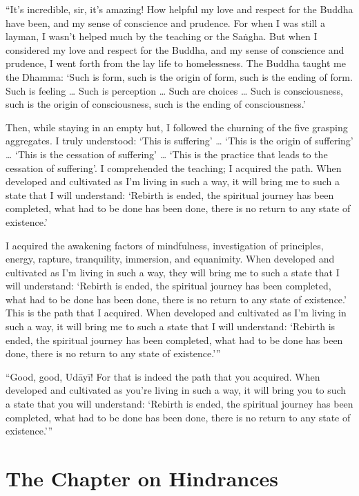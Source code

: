 \documentclass[12pt,openany]{book}%
\let\oldcontentsline\contentsline
\newcommand{\nopagecontentsline}[3]{\oldcontentsline{#1}{#2}{}}
\newcommand*{\tocchapterline}[1]{\bfseries\itshape{#1}}
\begin{document}
“It’s incredible, sir, it’s amazing! How helpful my love and respect for the Buddha have been, and my sense of conscience and prudence. For when I was still a layman, I wasn’t helped much by the teaching or the \textsanskrit{Saṅgha}. But when I considered my love and respect for the Buddha, and my sense of conscience and prudence, I went forth from the lay life to homelessness. The Buddha taught me the Dhamma: ‘Such is form, such is the origin of form, such is the ending of form. Such is feeling … Such is perception … Such are choices … Such is consciousness, such is the origin of consciousness, such is the ending of consciousness.’ 

Then, while staying in an empty hut, I followed the churning of the five grasping aggregates. I truly understood: ‘This is suffering’ … ‘This is the origin of suffering’ … ‘This is the cessation of suffering’ … ‘This is the practice that leads to the cessation of suffering’. I comprehended the teaching; I acquired the path. When developed and cultivated as I’m living in such a way, it will bring me to such a state that I will understand: ‘Rebirth is ended, the spiritual journey has been completed, what had to be done has been done, there is no return to any state of existence.’ 

I acquired the awakening factors of mindfulness, investigation of principles, energy, rapture, tranquility, immersion, and equanimity. When developed and cultivated as I’m living in such a way, they will bring me to such a state that I will understand: ‘Rebirth is ended, the spiritual journey has been completed, what had to be done has been done, there is no return to any state of existence.’ This is the path that I acquired. When developed and cultivated as I’m living in such a way, it will bring me to such a state that I will understand: ‘Rebirth is ended, the spiritual journey has been completed, what had to be done has been done, there is no return to any state of existence.’” 

“Good, good, \textsanskrit{Udāyī}! For that is indeed the path that you acquired. When developed and cultivated as you’re living in such a way, it will bring you to such a state that you will understand: ‘Rebirth is ended, the spiritual journey has been completed, what had to be done has been done, there is no return to any state of existence.’” 

%
\chapter*{The Chapter on Hindrances }
\addcontentsline{toc}{chapter}{\tocchapterline{The Chapter on Hindrances }}
\addtocontents{toc}{\let\protect\contentsline\protect\oldcontentsline}
\end{document}
